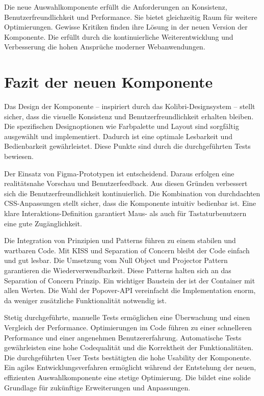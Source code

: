 Die neue Auswahlkomponente erfüllt die Anforderungen an Konsistenz, Benutzerfreundlichkeit und Performance. 
Sie bietet gleichzeitig Raum für weitere Optimierungen. 
Gewisse Kritiken finden ihre Lösung in der neuen Version der Komponente. 
Die  erfüllt durch die kontinuierliche Weiterentwicklung und Verbesserung die hohen Ansprüche moderner Webanwendungen. 


\section{Fazit der neuen Komponente}
\label{sec:summeryNew}

Das Design der Komponente – inspiriert durch das Kolibri-Designsystem – stellt sicher, dass die visuelle Konsistenz und Benutzerfreundlichkeit erhalten bleiben. 
Die spezifischen Designoptionen wie Farbpalette und Layout sind sorgfältig ausgewählt und implementiert. 
Dadurch ist eine optimale Lesbarkeit und Bedienbarkeit gewährleistet. 
Diese Punkte sind durch die durchgeführten Tests bewiesen. 

Der Einsatz von Figma-Prototypen ist entscheidend. 
Daraus erfolgen eine realitätsnahe Vorschau und Benutzerfeedback. 
Aus diesen Gründen verbessert sich die Benutzerfreundlichkeit kontinuierlich. 
Die Kombination von durchdachten CSS-Anpassungen stellt sicher, dass die Komponente intuitiv bedienbar ist. 
Eine klare Interaktions-Definition garantiert Maus- als auch für Tastaturbenutzern eine gute Zugänglichkeit. 

Die Integration von Prinzipien und Patterns führen zu einem stabilen und wartbaren Code. 
Mit KISS und Separation of Concern bleibt der Code einfach und gut lesbar. 
Die Umsetzung vom Null Object und Projector Pattern garantieren die Wiederverwendbarkeit. 
Diese Patterns halten sich an das Separation of Concern Prinzip. 
Ein wichtiger Baustein der  ist der Container mit allen Werten. 
Die Wahl der Popover-API vereinfacht die Implementation enorm, da weniger zusätzliche Funktionalität notwendig ist. 

Stetig durchgeführte, manuelle Tests ermöglichen eine Überwachung und einen Vergleich der Performance. 
Optimierungen im Code führen zu einer schnelleren Performance und einer angenehmen Benutzererfahrung. 
Automatische Tests gewährleisten eine hohe Codequalität und die Korrektheit der Funktionalitäten. 
Die durchgeführten User Tests bestätigten die hohe Usability der Komponente. 
Ein agiles Entwicklungsverfahren ermöglicht während der Entstehung der neuen, effizienten Auswahlkomponente eine stetige Optimierung. 
Die  bildet eine solide Grundlage für zukünftige Erweiterungen und Anpassungen. 
